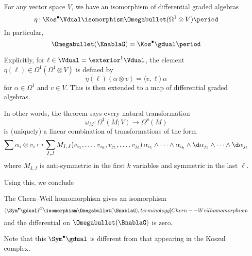 \begin{theorem}\label{thm:main}
  For any vector space $V$, we have an isomorphism of differential graded algebras
  \begin{equation*}
    \eta\colon \Kos^\bullet \Vdual \isomorphism \Omegabullet (\Omega^1 \otimes V)\period
  \end{equation*}
  In particular,
  \begin{equation*}
    \Omegabullet (\EnablaG) = \Kos^\bullet\gdual\period
  \end{equation*}

  Explicitly, for $\ell \in \Vdual = \exterior^1 \Vdual$, the element $\eta(\ell) \in \Omega^1(\Omega^1 \otimes V)$ is defined by
  \begin{equation*}
    \eta(\ell)(\alpha \otimes v) = \langle v, \ell\rangle\, \alpha
  \end{equation*}
  for $\alpha \in \Omega^1$ and $v \in V$. This is then extended to a map of differential graded algebras.

  In other words, the theorem says every natural transformation
  \begin{equation*}
    \omega_M\colon \Omega^1(M; V) \to \Omega^p(M)
  \end{equation*}
  is (uniquely) a linear combination of transformations of the form
  \begin{equation*}
    \sum \alpha_i \otimes v_i \mapsto \sum_{I, J} M_{I, J}(v_{i_1}, \ldots, v_{i_k}, v_{j_1}, \ldots, v_{j_\ell})\, \alpha_{i_1} \wedge \cdots \wedge \alpha_{i_k} \wedge \d \alpha_{j_1} \wedge \cdots \wedge \d \alpha_{j_\ell}
  \end{equation*}
  where $M_{I, J}$ is anti-symmetric in the first $k$ variables and symmetric in the last $\ell$.
\end{theorem}

Using this, we conclude
\begin{theorem}
  The Chern--Weil homomorphism gives an isomorphism
  \begin{equation*}
    (\Sym^\bullet\gdual)^G \isomorphism \Omegabullet(\BnablaG),  \index[terminology]{Chern--Weil homomorphism}
  \end{equation*}
  and the differential on $\Omegabullet(\BnablaG)$ is zero.
\end{theorem}
Note that this $\Sym^\bullet\gdual$ is different from that appearing in the Koszul complex.

